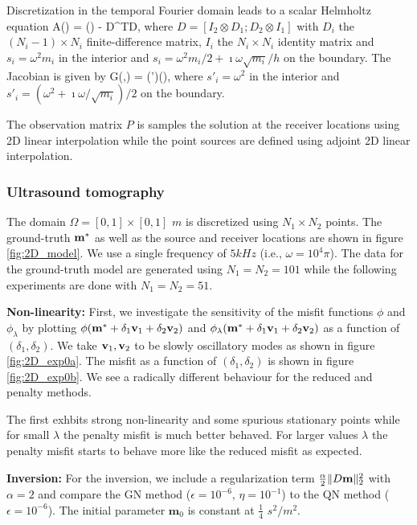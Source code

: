 \documentclass{iopart}
\begin{document}
Discretization in the temporal Fourier domain leads to a scalar Helmholtz equation
\bq
A() = () - D^TD,
\eq
where $D = [I_2\otimes D_1; D_2\otimes I_1]$ with $D_i$ the $(N_i-1)\times N_i$ finite-difference matrix, $I_i$ the $N_i\times N_i$ identity matrix
and $s_i = \omega^2 m_i$ in the interior and $s_i = \omega^2 m_i/2 + \imath\omega\sqrt{m_i}/h$ on the boundary.
The Jacobian is given by
\bq
G(,) = (')(),
\eq
where $s'_i = \omega^2$ in the interior and $s'_i = (\omega^2 + \imath\omega/\sqrt{m_i})/2$ on the boundary.

The observation matrix $P$ is samples the solution at the receiver locations using 2D linear interpolation while the point sources are defined using adjoint 2D linear interpolation.

\subsubsection{Ultrasound tomography}

The domain $\Omega = [0,1]\times [0,1]$ $m$  is discretized using $N_1\times N_2$ points. 
The ground-truth $\mathbf{m}^*$ as well as the source and receiver locations are shown in figure  \ref{fig:2D_model}. We use a single frequency of $5 kHz$ (i.e., $\omega = 10^4\pi$). The data for the ground-truth model are generated using $N_1=N_2=101$ while the following experiments are done with $N_1=N_2=51$.

\textbf{Non-linearity:}
First, we investigate the sensitivity of the misfit functions $\phi$ and $\phi_{\lambda}$ by plotting $\phi(\mathbf{m}^* + \delta_1 \mathbf{v}_1 + \delta_2\mathbf{v}_2)$ and $\phi_{\lambda}(\mathbf{m}^* + \delta_1 \mathbf{v}_1 + \delta_2\mathbf{v}_2)$ as a function of $(\delta_1,\delta_2)$. 
We take $\mathbf{v}_1, \mathbf{v}_2$ to be slowly oscillatory modes as shown in figure \ref{fig:2D_exp0a}. The misfit as a function of $(\delta_1,\delta_2)$ is shown in figure \ref{fig:2D_exp0b}. We see a radically different behaviour for the reduced and penalty methods.

The first exhbits strong non-linearity and some spurious stationary points while for small $\lambda$ the penalty misfit is much better behaved. For larger values $\lambda$ the penalty misfit starts to behave more like the reduced misfit as expected.

\textbf{Inversion:}
For the inversion, we include a regularization term $\frac{\alpha}{2} \|D\mathbf{m}\|_2^2$ with $\alpha = 2$ and compare  the GN method ($\epsilon=10^{-6}$, $\eta=10^{-1}$) to the QN method ($\epsilon=10^{-6}$). The initial parameter $\mathbf{m}_0$ is constant at $\frac{1}{4}$ $s^2/m^2$.
\end{document}
